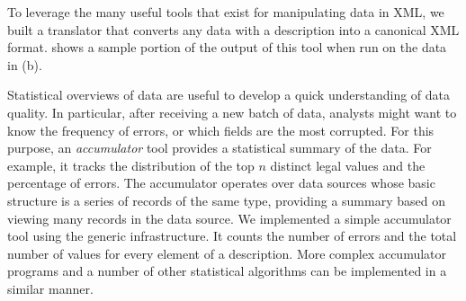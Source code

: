 To leverage the many useful tools that exist for manipulating data in XML, we built a translator that converts any data with a \padsml{} description into a canonical XML format.   shows a sample portion of the output of this tool when run on the \dibbler{} data in (b).  

Statistical overviews of data are useful to develop a quick understanding of data quality.  In particular,  after receiving a new batch of data, analysts might want to know the frequency of errors, or which fields are the most corrupted. For this purpose, an \emph{accumulator} tool provides a statistical summary of the data. For example, it tracks the distribution of the top $n$
distinct legal values and the percentage of errors. 
The accumulator operates over data sources
whose basic structure is a series of records of the same type, 
providing a summary based on viewing many records
in the data source.  We implemented a simple accumulator tool using the generic infrastructure.  It counts the number of errors and the total number of values for every element of a description.  More complex accumulator programs and a number of other statistical algorithms can be implemented in a similar manner.






	  
